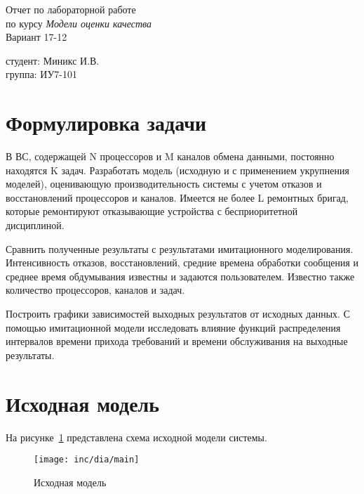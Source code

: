 \documentclass[utf8x, 12pt]{G7-32} %
\begin{document}
\frontmatter %


\nobreakingbeforechapters


\begin{center}
Отчет по лабораторной работе \\ по курсу \textit{Модели оценки качества} \\ Вариант 17-12 
\end{center}
\begin{flushright}
студент: Миникс И.В.\\ группа: ИУ7-101
\end{flushright}

\section{Формулировка задачи}

В ВС, содержащей N процессоров и M каналов обмена данными, постоянно находятся K задач. Разработать модель (исходную и с применением укрупнения моделей), оценивающую производительность системы с учетом отказов и восстановлений процессоров и каналов. Имеется не более L ремонтных бригад, которые ремонтируют отказывающие устройства с бесприоритетной дисциплиной. 

Сравнить полученные результаты с результатами имитационного моделирования. Интенсивность отказов, восстановлений, средние времена обработки сообщения и среднее время обдумывания известны и задаются пользователем. Известно также количество процессоров, каналов и задач.

Построить графики зависимостей выходных результатов от исходных данных. С помощью имитационной модели исследовать влияние функций распределения интервалов времени прихода требований и времени обслуживания на выходные результаты.


\section {Исходная модель}
На рисунке~\ref{fig:main} представлена схема исходной модели системы.
\begin{figure}[ht]
\centering
\texttt{[image: inc/dia/main]}
\caption{Исходная модель}
\label{fig:main}
\end{figure}
\end{document}
